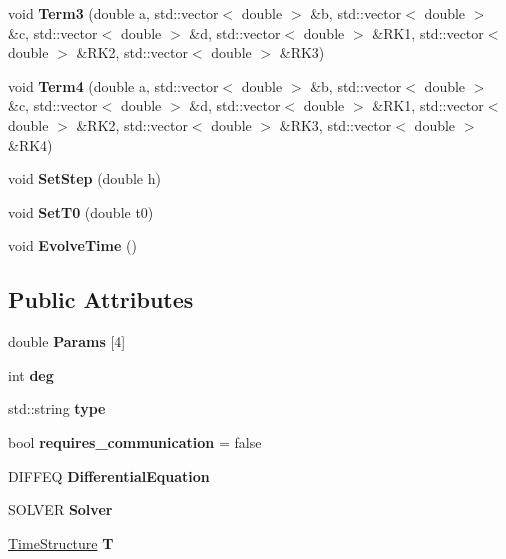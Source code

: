 \begin{DoxyCompactItemize}
void {\bfseries Term3} (double a, std\+::vector$<$ double $>$ \&b, std\+::vector$<$ double $>$ \&c, std\+::vector$<$ double $>$ \&d, std\+::vector$<$ double $>$ \&R\+K1, std\+::vector$<$ double $>$ \&R\+K2, std\+::vector$<$ double $>$ \&R\+K3)
\item 
\mbox{\label{classGeneralSolver_a656257a26a068283f5e296a0c800baf6}} 
void {\bfseries Term4} (double a, std\+::vector$<$ double $>$ \&b, std\+::vector$<$ double $>$ \&c, std\+::vector$<$ double $>$ \&d, std\+::vector$<$ double $>$ \&R\+K1, std\+::vector$<$ double $>$ \&R\+K2, std\+::vector$<$ double $>$ \&R\+K3, std\+::vector$<$ double $>$ \&R\+K4)
\item 
\mbox{\label{classGeneralSolver_a37505b19e23e7949e5ec1c95ac556e11}} 
void {\bfseries Set\+Step} (double h)
\item 
\mbox{\label{classGeneralSolver_a29e088c061743d092a681666599bcfa4}} 
void {\bfseries Set\+T0} (double t0)
\item 
\mbox{\label{classGeneralSolver_a20243a636c94dbdd8bf56873497721f7}} 
void {\bfseries Evolve\+Time} ()
\end{DoxyCompactItemize}
\subsection*{Public Attributes}
\begin{DoxyCompactItemize}
\item 
\mbox{\label{classGeneralSolver_aab8c1ef25686ffb53c043e1c1ff098d2}} 
double {\bfseries Params} \mbox{[}4\mbox{]}
\item 
\mbox{\label{classGeneralSolver_ab04759cf4ed2570d988446cfb121c0cc}} 
int {\bfseries deg}
\item 
\mbox{\label{classGeneralSolver_a44930211006db48661bf9bbef9722ea1}} 
std\+::string {\bfseries type}
\item 
\mbox{\label{classGeneralSolver_a4adb47207dde1bf87b13c8c04cbbb89f}} 
bool {\bfseries requires\+\_\+communication} = false
\item 
\mbox{\label{classGeneralSolver_a2585069188cd1b9abdf7e66bb029481c}} 
D\+I\+F\+F\+EQ {\bfseries Differential\+Equation}
\item 
\mbox{\label{classGeneralSolver_a56c223b1e7d8679d97bf7f153f09bd07}} 
S\+O\+L\+V\+ER {\bfseries Solver}
\item 
\mbox{\label{classGeneralSolver_a6bedad6e0a204022c10363aa8f0bb302}} 
\hyperlink{structTimeStructure}{Time\+Structure} {\bfseries T}
\end{DoxyCompactItemize}


